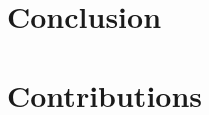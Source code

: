 \documentclass{article}
\begin{document}

\section{Conclusion}


\nocite{langley00}





\section{Contributions}
\end{document}
